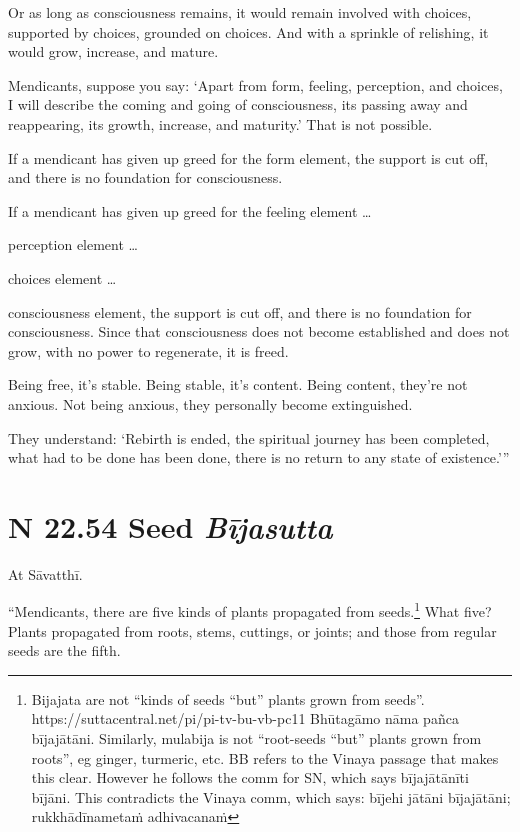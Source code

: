 \documentclass[12pt,openany]{book}%
\newcommand*{\suttatitleacronym}[1]{\smaller[2]{#1}\vspace*{.3em}}
\newcommand*{\suttatitletranslation}[1]{\linebreak{#1}}
\newcommand*{\suttatitleroot}[1]{\linebreak\smaller[2]\itshape{#1}}
\newcommand*{\tocacronym}[1]{\hspace*{-3.3em}{#1}\quad}
\newcommand*{\toctranslation}[1]{#1}
\newcommand*{\tocroot}[1]{(\textit{#1})}
\begin{document}
Or as long as consciousness remains, it would remain involved with choices, supported by choices, grounded on choices. And with a sprinkle of relishing, it would grow, increase, and mature. 

Mendicants, suppose you say: ‘Apart from form, feeling, perception, and choices, I will describe the coming and going of consciousness, its passing away and reappearing, its growth, increase, and maturity.’ That is not possible. 

If a mendicant has given up greed for the form element, the support is cut off, and there is no foundation for consciousness. 

If a mendicant has given up greed for the feeling element … 

perception element … 

choices element … 

consciousness element, the support is cut off, and there is no foundation for consciousness. Since that consciousness does not become established and does not grow, with no power to regenerate, it is freed. 

Being free, it’s stable. Being stable, it’s content. Being content, they’re not anxious. Not being anxious, they personally become extinguished. 

They understand: ‘Rebirth is ended, the spiritual journey has been completed, what had to be done has been done, there is no return to any state of existence.’” 

%
\section*{{\suttatitleacronym SN 22.54}{\suttatitletranslation A Seed }{\suttatitleroot Bījasutta}}
\addcontentsline{toc}{section}{\tocacronym{SN 22.54} \toctranslation{A Seed } \tocroot{Bījasutta}}

At \textsanskrit{Sāvatthī}. 

“Mendicants, there are five kinds of plants propagated from seeds.\footnote{Bijajata are not “kinds of seeds “but” plants grown from seeds”. https://suttacentral.net/pi/pi-tv-bu-vb-pc11 \textsanskrit{Bhūtagāmo} \textsanskrit{nāma} \textsanskrit{pañca} \textsanskrit{bījajātāni}. Similarly, mulabija is not “root-seeds “but” plants grown from roots”, eg ginger, turmeric, etc. BB refers to the Vinaya passage that makes this clear. However he follows the comm for SN, which says \textsanskrit{bījajātānīti} \textsanskrit{bījāni}. This contradicts the Vinaya comm, which says: \textsanskrit{bījehi} \textsanskrit{jātāni} \textsanskrit{bījajātāni}; \textsanskrit{rukkhādīnametaṁ} \textsanskrit{adhivacanaṁ} } What five? Plants propagated from roots, stems, cuttings, or joints; and those from regular seeds are the fifth. 
\end{document}

